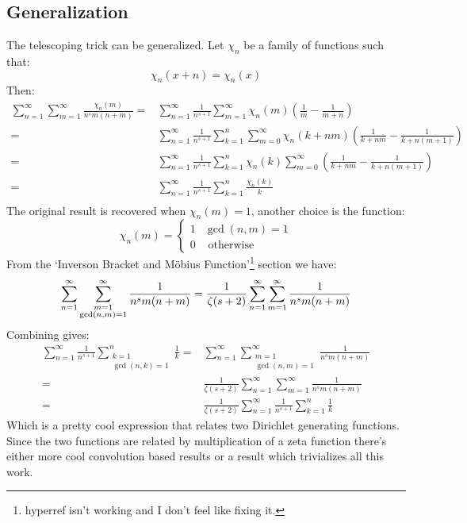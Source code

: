 \subsection{Generalization}
The telescoping trick can be generalized.
Let $\chi_n$ be a family of functions such that:
\[\chi_n(x+n)=\chi_n(x)\]
Then:
\begin{equation*}
\begin{aligned}
	\sum_{n=1}^\infty\sum_{m=1}^\infty\frac{\chi_n(m)}{n^sm(n+m)} =& \sum_{n=1}^\infty\frac{1}{n^{s+1}}\sum_{m=1}^\infty\chi_n(m)\left(\frac{1}{m}-\frac{1}{m+n}\right)\\
	=& \sum_{n=1}^\infty\frac{1}{n^{s+1}}\sum_{k=1}^n\sum_{m=0}^\infty\chi_n(k+nm)\left(\frac{1}{k+nm}-\frac{1}{k+n(m+1)}\right)\\
	=& \sum_{n=1}^\infty\frac{1}{n^{s+1}}\sum_{k=1}^n\chi_n(k)\sum_{m=0}^\infty\left(\frac{1}{k+nm}-\frac{1}{k+n(m+1)}\right)\\
	=& \sum_{n=1}^\infty\frac{1}{n^{s+1}}\sum_{k=1}^n\frac{\chi_n(k)}{k}\\
\end{aligned}
\end{equation*}
The original result is recovered when $\chi_n(m)=1$,
another choice is the function:
\[\chi_n(m)=\begin{cases}1&\gcd(n,m)=1\\0&\text{ otherwise}\end{cases}\]
From the `Inverson Bracket and Möbius Function'\footnote{hyperref isn't working and I don't feel like fixing it.} section we have:
\[\sum_{n=1}^\infty\sum_{\substack{m=1\\\gcd(n,m)=1}}^\infty\frac{1}{n^sm(n+m)}\\= \frac{1}{\zeta(s+2)}\sum_{n=1}^\infty\sum_{m=1}^\infty\frac{1}{n^sm(n+m)}\]
Combining gives:
\begin{equation*}
\begin{aligned}
	\sum_{n=1}^\infty\frac{1}{n^{s+1}}\sum_{\substack{k=1\\\gcd(n,k)=1}}^n\frac{1}{k}
	=& \sum_{n=1}^\infty\sum_{\substack{m=1\\\gcd(n,m)=1}}^\infty\frac{1}{n^sm(n+m)}\\
	=& \frac{1}{\zeta(s+2)}\sum_{n=1}^\infty\sum_{m=1}^\infty\frac{1}{n^sm(n+m)}\\
	=& \frac{1}{\zeta(s+2)}\sum_{n=1}^\infty\frac{1}{n^{s+1}}\sum_{k=1}^n\frac{1}{k}
\end{aligned}
\end{equation*}
Which is a pretty cool expression that relates two Dirichlet generating functions.
Since the two functions are related by multiplication of a zeta function there's either more cool convolution based results or a result which trivializes all this work.
